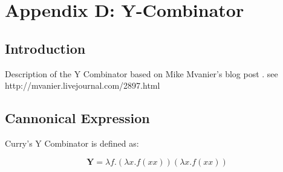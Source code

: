 
\section{Appendix D: Y-Combinator}
\label{sec:appendix_ycombinator}
\subsection{Introduction}
     Description of the Y Combinator based on Mike Mvanier's blog post \cite{Mvanier}.
     see http://mvanier.livejournal.com/2897.html

% 
% 

      \subsection{Cannonical Expression}

        Curry's Y Combinator \cite{WikiY} is defined as:

        \begin{equation}
        \mathbf{Y} = 
        \lambda f . 
        \left( \lambda x . f \left( x x \right) \right)
        \left( \lambda x . f \left( x x \right) \right)
        \label{eq:y_combinator}
        \end{equation}

